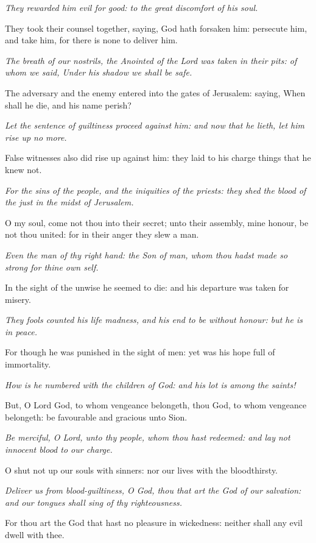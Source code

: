 \textit{They rewarded him evil for good: to the great discomfort of his
soul.}

They took their counsel together, saying, God hath forsaken him: persecute him, and take him, for there is none to deliver him.

\textit{The breath of our nostrils, the Anointed of the Lord was taken in their pits: of whom we said, Under his shadow we shall be safe.}

The adversary and the enemy entered into the gates of Jerusalem: saying, When shall he die, and his name perish?

\textit{Let the sentence of guiltiness proceed against him: and now that he lieth, let him rise up no more.}

False witnesses also did rise up against him: they laid to his charge things that he knew not.

\textit{For the sins of the people, and the iniquities of the priests: they shed the blood of the just in the midst of Jerusalem.}

O my soul, come not thou into their secret; unto their assembly, mine honour, be not thou united: for in their anger they slew a man.

\textit{Even the man of thy right hand: the Son of man, whom thou hadst made so strong for thine own self.}

In the sight of the unwise he seemed to die: and his departure was taken for misery.

\textit{They fools counted his life madness, and his end to be without honour: but he is in peace.}

For though he was punished in the sight of men: yet was his hope full of immortality.

\textit{How is he numbered with the children of God: and his lot is
among the saints!}

But, O Lord God, to whom vengeance belongeth, thou God, to whom vengeance belongeth: be favourable and gracious unto Sion.

\textit{Be merciful, O Lord, unto thy people, whom thou hast redeemed: and lay not innocent blood to our charge.}

O shut not up our souls with sinners: nor our lives with the bloodthirsty.

\textit{Deliver us from blood-guiltiness, O God, thou that art the God of our
salvation: and our tongues shall sing of thy righteousness.}

For thou art the God that hast no pleasure in wickedness: neither shall any evil dwell with thee.

